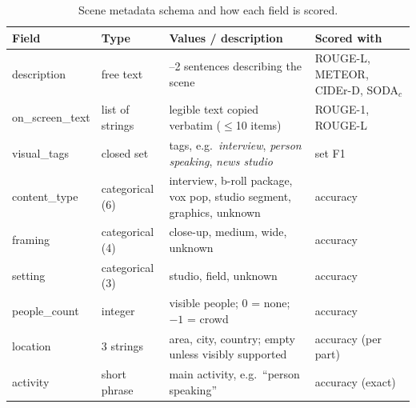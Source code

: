 
\begin{table}[t]
\centering
\caption{Scene metadata schema and how each field is scored.}
\label{tab:schema}
\scriptsize
\setlength{\tabcolsep}{4pt}
\begin{tabular}{@{}l l >{\raggedright\arraybackslash}p{3.9cm} >{\raggedright\arraybackslash}p{2.3cm}@{}}
\toprule
Field & Type & Values / description & Scored with \\
\midrule
description & free text & 1--2 sentences describing the scene & ROUGE-L, METEOR, CIDEr-D, SODA$_c$ \\
on\_screen\_text & list of strings & legible text copied verbatim ($\leq$10 items) & ROUGE-1, ROUGE-L \\
visual\_tags & closed set & 27 tags, e.g.\ \emph{interview}, \emph{person speaking}, \emph{news studio} & set F1 \\
content\_type & categorical (6) & interview, b-roll package, vox pop, studio segment, graphics, unknown & accuracy \\
framing & categorical (4) & close-up, medium, wide, unknown & accuracy \\
setting & categorical (3) & studio, field, unknown & accuracy \\
people\_count & integer & visible people; 0 = none; $-1$ = crowd & accuracy \\
location & 3 strings & area, city, country; empty unless visibly supported & accuracy (per part) \\
activity & short phrase & main activity, e.g.\ ``person speaking'' & accuracy (exact) \\
\bottomrule
\end{tabular}
\end{table}


